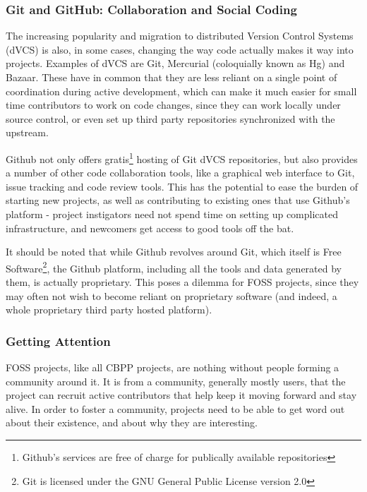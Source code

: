\documentclass[a4paper,11pt]{article} %
\begin{document}
\subsubsection{Git and GitHub: Collaboration and Social Coding}
The increasing popularity and migration to distributed Version Control
Systems (dVCS) is also, in some cases, changing the way code actually
makes it way into projects. Examples of dVCS are Git, Mercurial
(coloquially known as Hg) and Bazaar. These have in common that they
are less reliant on a single point of coordination during active
development, which can make it much easier for small time contributors
to work on code changes, since they can work locally under source
control, or even set up third party repositories synchronized with the
upstream.

Github not only offers gratis\footnote{Github's services are free of
  charge for publically available repositories} hosting of Git dVCS
repositories, but also provides a number of other code collaboration
tools, like a graphical web interface to Git, issue tracking and code
review tools. This has the potential to ease the burden of starting
new projects, as well as contributing to existing ones that use
Github's platform - project instigators need not spend time on setting
up complicated infrastructure, and newcomers get access to good tools
off the bat.

It should be noted that while Github revolves around Git, which itself
is Free Software\footnote{Git is licensed under the GNU General Public
  License version 2.0}, the Github platform, including all the tools
and data generated by them, is actually proprietary. This poses a
dilemma for FOSS projects, since they may often not wish to become
reliant on proprietary software (and indeed, a whole proprietary third
party hosted platform).


\subsubsection{Getting Attention}
FOSS projects, like all CBPP projects, are nothing without people
forming a community around it. It is from a community, generally
mostly users, that the project can recruit active contributors that
help keep it moving forward and stay alive. In order to foster a
community, projects need to be able to get word out about their
existence, and about why they are interesting.
\end{document}
